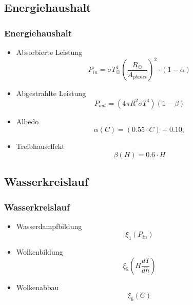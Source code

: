 \documentclass[english, aspectratio=169]{beamer}
\begin{document}
\subsection{Energiehaushalt}
\begin{frame}
\frametitle{Energiehaushalt}
\begin{itemize}
	\item[] Absorbierte Leistung
	\begin{equation}
	P_{in} = \sigma T_{\astrosun}^4 \left( \frac{R_{\astrosun}}{A_{planet}} \right) ^2 \cdot (1-\alpha)
	\end{equation}
	\pause
	
	\item[] Abgestrahlte Leistung
	\begin{equation}
	P_{out} = (4 \pi R^2 \sigma T^4)(1 - \beta)
	\end{equation}
	\pause
	
	\item[] Albedo
	\begin{equation}
	\alpha(C) = (0.55 \cdot C) + 0.10;
	\end{equation}
	\pause
	
	\item[] Treibhauseffekt
	\begin{equation}
	\beta(H) = 0.6 \cdot H
	\end{equation}
\end{itemize}
\end{frame}




\subsection{Wasserkreislauf}

\begin{frame}
	\frametitle{Wasserkreislauf}
	\begin{itemize}
		\item[] Wasserdampfbildung
			\begin{equation}
			\xi_4 (P_{in})
			\end{equation} 
		\pause
		\item[] Wolkenbildung
			\begin{equation}
			\xi_5 \left( H \frac{dT}{dh} \right)
			\end{equation}
		\pause
		\item[] Wolkenabbau 
		 	\begin{equation}
			\xi_6 (C)
			\end{equation}
	\end{itemize}
\end{frame}
\end{document}
